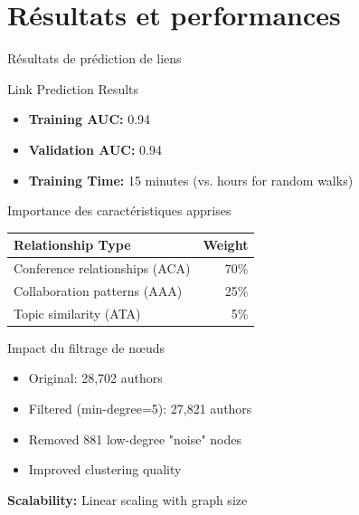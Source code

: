 \documentclass[9pt,aspectratio=169,professionalfonts]{beamer}
\begin{document}
\section{Résultats et performances}

\begin{frame}{Résultats de prédiction de liens}
\begin{block}{Link Prediction Results}
\begin{itemize}
    \item \textbf{Training AUC:} 0.94
    \item \textbf{Validation AUC:} 0.94
    \item \textbf{Training Time:} 15 minutes (vs. hours for random walks)
\end{itemize}
\end{block}

\begin{block}{Importance des caractéristiques apprises}
\begin{center}
\begin{tabular}{lr}
\toprule
\textbf{Relationship Type} & \textbf{Weight} \\
\midrule
Conference relationships (ACA) & 70\% \\
Collaboration patterns (AAA) & 25\% \\
Topic similarity (ATA) & 5\% \\
\bottomrule
\end{tabular}
\end{center}
\end{block}

\begin{block}{Impact du filtrage de nœuds}
\begin{itemize}
    \item Original: 28,702 authors
    \item Filtered (min-degree=5): 27,821 authors
    \item Removed 881 low-degree "noise" nodes
    \item Improved clustering quality
\end{itemize}
\end{block}

\textbf{Scalability:} Linear scaling with graph size
\end{frame}
\end{document}

